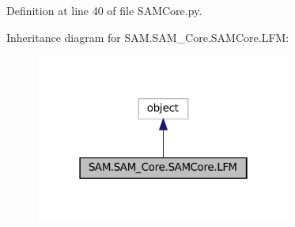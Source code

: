 Definition at line 40 of file S\+A\+M\+Core.\+py.



Inheritance diagram for S\+A\+M.\+S\+A\+M\+\_\+\+Core.\+S\+A\+M\+Core.\+L\+FM\+:
\nopagebreak
\begin{figure}[H]
\begin{center}
\leavevmode
\includegraphics[width=238pt]{classSAM_1_1SAM__Core_1_1SAMCore_1_1LFM__inherit__graph}
\end{center}
\end{figure}
